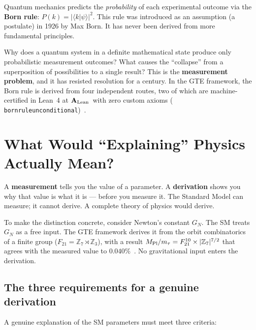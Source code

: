 \documentclass[11pt,a4paper]{article}
\newcommand{\term}[1]{\textbf{#1}}
\newcommand{\lean}[1]{%
  \penalty-100
  \begingroup\def\_{\textunderscore\allowbreak}\texttt{#1}\endgroup}
\newcommand{\CatAL}{\ensuremath{\mathbf{A}_{\rm Lean}}}
\begin{document}
Quantum mechanics predicts the \emph{probability} of each experimental outcome
via the \term{Born rule}: $P(k) = |\langle k | \psi \rangle|^2$.
This rule was introduced as an assumption (a postulate) in 1926 by Max Born.
It has never been derived from more fundamental principles.

Why does a quantum system in a definite mathematical state produce only
probabilistic measurement outcomes?
What causes the ``collapse'' from a superposition of possibilities to a
single result?
This is the \term{measurement problem}, and it has resisted resolution for
a century.
In the GTE framework, the Born rule is derived from four independent routes,
two of which are machine-certified in Lean~4 at \CatAL\ with zero custom
axioms (\lean{born\_rule\_unconditional})~\cite{SpivackBornRule}.

\section{What Would ``Explaining'' Physics Actually Mean?}
\label{sec:explain}

\begin{tcolorbox}[colback=boxgreen,colframe=green!50!black,
  title=The distinction that matters]
A \textbf{measurement} tells you the value of a parameter.
A \textbf{derivation} shows you why that value is what it is ---
before you measure it.
The Standard Model can measure; it cannot derive.
A complete theory of physics would derive.
\end{tcolorbox}

To make the distinction concrete, consider Newton's constant $G_N$.
The SM treats $G_N$ as a free input.
The GTE framework derives it from the orbit combinatorics of a finite group
($F_{21} = \mathbb{Z}_7 \rtimes \mathbb{Z}_3$), with a result
$M_{\rm Pl}/m_\tau = F_{21}^{10} \times |\mathbb{Z}_7|^{7/2}$
that agrees with the measured value to $0.040\%$~\cite{SpivackGTECompleteFramework}.
No gravitational input enters the derivation.

\subsection{The three requirements for a genuine derivation}

A genuine explanation of the SM parameters must meet three criteria:
\end{document}
